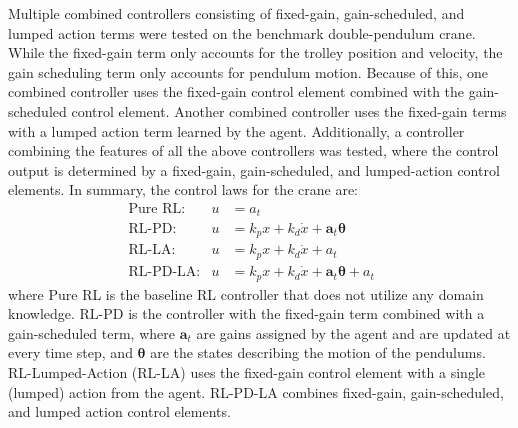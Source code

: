 Multiple combined controllers consisting of fixed-gain, gain-scheduled, and lumped action terms were tested on the benchmark double-pendulum crane.
%
While the fixed-gain term only accounts for the trolley position and velocity, the gain scheduling term only accounts for pendulum motion. Because of this, one combined controller uses the fixed-gain control element combined with the gain-scheduled control element. Another combined controller uses the fixed-gain terms with a lumped action term learned by the agent.
Additionally, a controller combining the features of all the above controllers was tested, where the control output is determined by a fixed-gain, gain-scheduled, and lumped-action control elements. In summary, the control laws for the crane are:
%
\begin{align}
&\qquad\qquad\text{Pure RL:} & u&=a_t \qquad\qquad\qquad\\
&\qquad\qquad\text{RL-PD:} & u&=k_px+k_d\dot{x} + \boldsymbol{a}_t\boldsymbol{\theta} \qquad\qquad\qquad\\
&\qquad\qquad\text{RL-LA:} & u&=k_px+k_d\dot{x} + a_t \qquad\qquad\qquad\\
&\qquad\qquad\text{RL-PD-LA:} & u&=k_px+k_d\dot{x} + \boldsymbol{a}_t\boldsymbol{\theta} + a_t \qquad\qquad\qquad
\end{align}
%
where Pure RL is the baseline RL controller that does not utilize any domain knowledge. RL-PD is the controller with the fixed-gain term combined with a gain-scheduled term, where $\boldsymbol{a}_t$ are gains assigned by the agent and are updated at every time step, and $\boldsymbol{\theta}$ are the states describing the motion of the pendulums. RL-Lumped-Action (RL-LA) uses the fixed-gain control element with a single (lumped) action from the agent. RL-PD-LA combines fixed-gain, gain-scheduled, and lumped action control elements.

